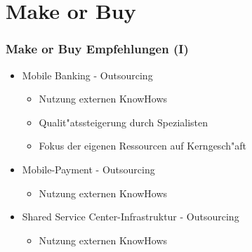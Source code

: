 \documentclass{beamer}
\begin{document}
\section{Make or Buy}
\begin{frame}
  \frametitle{Make or Buy Empfehlungen (I)}
  \begin{itemize}

	\item Mobile Banking - Outsourcing
		\begin{itemize}
			\item Nutzung externen KnowHows
			\item Qualit"atssteigerung durch Spezialisten
			\item Fokus der eigenen Ressourcen auf Kerngesch"aft\vspace{2mm}
		\end{itemize}
	\item Mobile-Payment - Outsourcing
		\begin{itemize}
			\item Nutzung externen KnowHows\vspace{2mm}
		\end{itemize}
	\item Shared Service Center-Infrastruktur - Outsourcing
			\begin{itemize}
			\item Nutzung externen KnowHows\vspace{2mm}
		\end{itemize}

  \end{itemize}
\end{frame}
\end{document}
